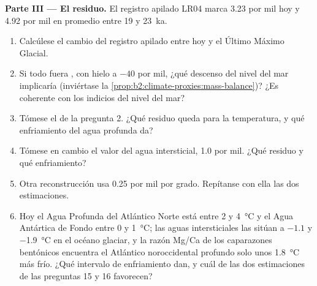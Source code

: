 \begin{problem}
\medskip\noindent\textbf{Parte III --- El residuo.}
El registro apilado LR04 marca \num{3.23} por mil hoy y \num{4.92} por mil en promedio entre 19 y
\qty{23}{ka}.
\begin{enumerate}[resume]
  \item Calcúlese el cambio del registro apilado entre hoy y el Último Máximo Glacial.
  \item Si todo fuera , con hielo a $-40$ por mil, ¿qué descenso del nivel del mar
        implicaría (inviértase la \cref{prop:b2:climate-proxies:mass-balance})? ¿Es coherente con los
        indicios del nivel del mar?
  \item Tómese el  de la pregunta 2. ¿Qué residuo queda para la temperatura, y
        qué enfriamiento del agua profunda da?
  \item Tómese en cambio el valor del agua intersticial, \num{1.0} por mil. ¿Qué residuo y qué enfriamiento?
  \item Otra reconstrucción usa \num{0.25} por mil por grado. Repítanse con ella las dos estimaciones.
  \item Hoy el Agua Profunda del Atlántico Norte está entre 2 y \qty{4}{\celsius} y el Agua Antártica de
        Fondo entre 0 y \qty{1}{\celsius}; las aguas intersticiales las sitúan a $-1.1$ y \qty{-1.9}{\celsius}
        en el océano glaciar, y la razón Mg/Ca de los caparazones bentónicos encuentra el Atlántico noroccidental profundo
        solo unos \qty{1.8}{\celsius} más frío. ¿Qué intervalo de enfriamiento dan, y cuál de las
        dos estimaciones de las preguntas 15 y 16 favorecen?
\end{enumerate}


\end{problem}
